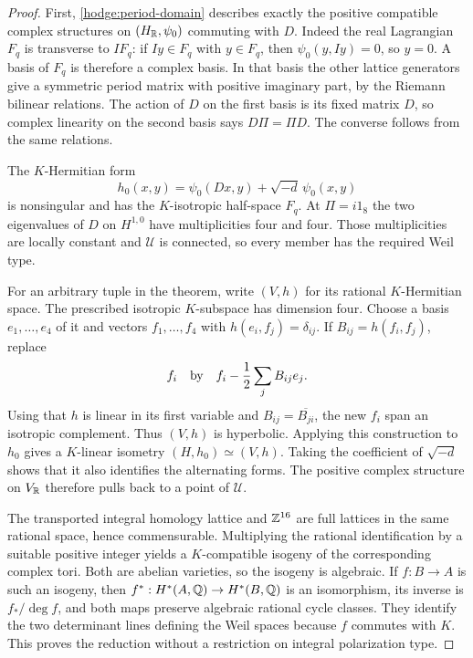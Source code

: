 \begin{proof}
First, \eqref{hodge:period-domain} describes exactly the positive compatible
complex structures on $(H_\mathbb R,\psi_0)$ commuting with $D$.  Indeed the real
Lagrangian $F_q$ is transverse to $I F_q$: if $Iy\in F_q$ with
$y\in F_q$, then $\psi_0(y,Iy)=0$, so $y=0$.  A basis of $F_q$ is
therefore a complex basis.  In that basis the other lattice generators
give a symmetric period matrix with positive imaginary part, by the
Riemann bilinear relations.  The action of $D$ on the first basis is its
fixed matrix $D$, so complex linearity on the second basis says
$D\Pi=\Pi D$.  The converse follows from the same relations.

The $K$-Hermitian form
\[
 h_0(x,y)=\psi_0(Dx,y)+\sqrt{-d}\,\psi_0(x,y)
\]
is nonsingular and has the $K$-isotropic half-space $F_q$.  At $\Pi=i1_8$
the two eigenvalues of $D$ on $H^{1,0}$ have multiplicities four and four.
Those multiplicities are locally constant and $\mathcal U$ is connected,
so every member has the required Weil type.

For an arbitrary tuple in the theorem, write $(V,h)$ for its rational
$K$-Hermitian space.  The prescribed isotropic $K$-subspace has dimension
four.  Choose a basis $e_1,\ldots,e_4$ of it and vectors
$f_1,\ldots,f_4$ with $h(e_i,f_j)=\delta_{ij}$.
If $B_{ij}=h(f_i,f_j)$, replace
\[
 f_i\quad\hbox{by}\quad
 f_i-\frac12\sum_j B_{ij}e_j.
\]
Using that $h$ is linear in its first variable and
$B_{ij}=\overline{B_{ji}}$, the new $f_i$ span an isotropic complement.
Thus $(V,h)$ is hyperbolic.  Applying this construction to $h_0$ gives a
$K$-linear isometry $(H,h_0)\simeq(V,h)$.  Taking the coefficient of
$\sqrt{-d}$ shows that it also identifies the alternating forms.
The positive complex structure on $V_\mathbb R$ therefore pulls back to a
point of $\mathcal U$.

The transported integral homology lattice and $\mathbb Z^{16}$ are full lattices
in the same rational space, hence commensurable.  Multiplying the rational
identification by a suitable positive integer yields a $K$-compatible
isogeny of the corresponding complex tori.  Both are abelian varieties,
so the isogeny is algebraic.  If $f:B\to A$ is such an isogeny, then
$f^*:H^*(A,\mathbb Q)\to H^*(B,\mathbb Q)$ is an isomorphism, its inverse is
$f_*/\deg f$, and both maps preserve algebraic rational cycle classes.
They identify the two determinant lines defining the Weil spaces because
$f$ commutes with $K$.  This proves the reduction without a restriction
on integral polarization type.
\end{proof}

